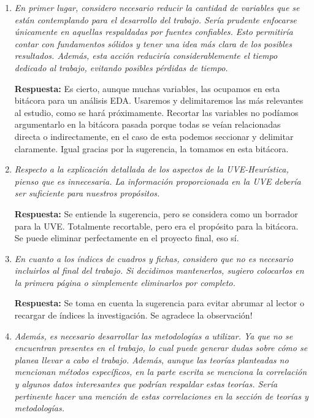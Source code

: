 \begin{enumerate}
    \item \textit{En primer lugar, considero necesario reducir la cantidad de variables que se están contemplando para el desarrollo del trabajo. Sería prudente enfocarse únicamente en aquellas respaldadas por fuentes confiables. Esto permitiría contar con fundamentos sólidos y tener una idea más clara de los posibles resultados. Además, esta acción reduciría considerablemente el tiempo dedicado al trabajo, evitando posibles pérdidas de tiempo.} 

    \textbf{Respuesta:} Es cierto, aunque muchas variables, las ocupamos en esta bitácora para un análisis EDA. Usaremos y delimitaremos las más relevantes al estudio, como se hará próximamente. Recortar las variables no podíamos argumentarlo en la bitácora pasada porque todas se veían relacionadas directa o indirectamente, en el caso de esta podemos seccionar y delimitar claramente. Igual gracias por la sugerencia, la tomamos en esta bitácora. 

    \item \textit{Respecto a la explicación detallada de los aspectos de la UVE-Heurística, pienso que es innecesaria. La información proporcionada en la UVE debería ser suficiente para nuestros propósitos.}

    \textbf{Respuesta:} Se entiende la sugerencia, pero se considera como un borrador para la UVE. Totalmente recortable, pero era el propósito para la bitácora. Se puede eliminar perfectamente en el proyecto final, eso sí.

    \item \textit{En cuanto a los índices de cuadros y fichas, considero que no es necesario incluirlos al final del trabajo. Si decidimos mantenerlos, sugiero colocarlos en la primera página o simplemente eliminarlos por completo.}

    \textbf{Respuesta:} Se toma en cuenta la sugerencia para evitar abrumar al lector o recargar de índices la investigación. Se agradece la observación!
    
    \item \textit{Además, es necesario desarrollar las metodologías a utilizar. Ya que no se encuentran presentes en el trabajo, lo cual puede generar dudas sobre cómo se planea llevar a cabo el trabajo. Además, aunque las teorías planteadas no mencionan métodos específicos, en la parte escrita se menciona la correlación y algunos datos interesantes que podrían respaldar estas teorías. Sería pertinente hacer una mención de estas correlaciones en la sección de teorías y metodologías.} 


\end{enumerate}
